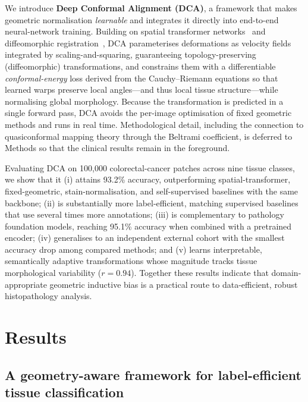 \documentclass[pdflatex,sn-nature]{sn-jnl}%
\theoremstyle{thmstyleone}%
\theoremstyle{thmstyletwo}%
\theoremstyle{thmstylethree}%
\begin{document}
We introduce \textbf{Deep Conformal Alignment (DCA)}, a framework that makes
geometric normalisation \textit{learnable} and integrates it directly into
end-to-end neural-network training. Building on spatial transformer
networks~\cite{jaderberg2015spatial} and diffeomorphic
registration~\cite{balakrishnan2019voxelmorph}, DCA parameterises deformations as
velocity fields integrated by scaling-and-squaring, guaranteeing
topology-preserving (diffeomorphic) transformations, and constrains them with a
differentiable \textit{conformal-energy} loss derived from the Cauchy--Riemann
equations so that learned warps preserve local angles---and thus local tissue
structure---while normalising global morphology. Because the transformation is
predicted in a single forward pass, DCA avoids the per-image optimisation of fixed
geometric methods and runs in real time. Methodological detail, including the
connection to quasiconformal mapping theory through the Beltrami coefficient, is
deferred to Methods so that the clinical results remain in the foreground.

Evaluating DCA on 100{,}000 colorectal-cancer patches across nine tissue classes,
we show that it (i) attains 93.2\% accuracy, outperforming spatial-transformer,
fixed-geometric, stain-normalisation, and self-supervised baselines with the same
backbone; (ii) is substantially more label-efficient, matching supervised
baselines that use several times more annotations; (iii) is complementary to
pathology foundation models, reaching 95.1\% accuracy when combined with a
pretrained encoder; (iv) generalises to an independent external cohort with the
smallest accuracy drop among compared methods; and (v) learns interpretable,
semantically adaptive transformations whose magnitude tracks tissue morphological
variability ($r=0.94$). Together these results indicate that domain-appropriate
geometric inductive bias is a practical route to data-efficient, robust
histopathology analysis.

\section{Results}
\label{sec:results}

\subsection{A geometry-aware framework for label-efficient tissue classification}
\end{document}

